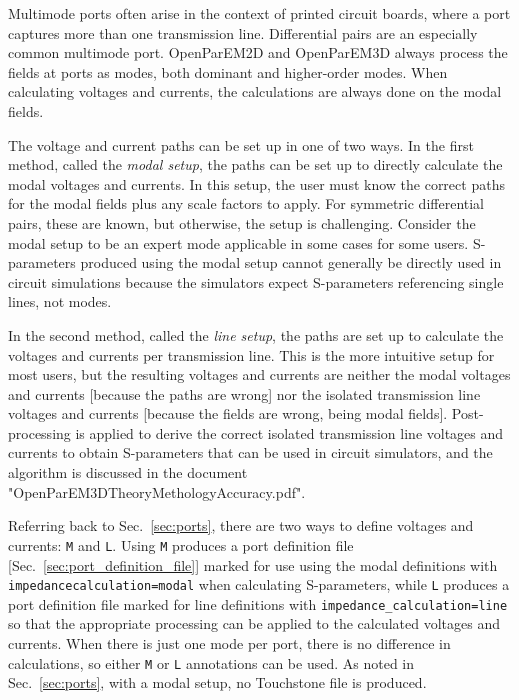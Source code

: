 \documentclass[titlepage]{article}
\renewcommand\_{\textunderscore\linebreak[1]}
\begin{document}
Multimode ports often arise in the context of printed circuit boards, where a port captures more than one transmission line.  Differential pairs are an especially common multimode port.  OpenParEM2D and OpenParEM3D always process the fields at ports as modes, both dominant and higher-order modes. When calculating voltages and currents, the calculations are always done on the modal fields.

The voltage and current paths can be set up in one of two ways.  In the first method, called the \textit{modal setup}, the paths can be set up to directly calculate the modal voltages and currents.  In this setup, the user must know the correct paths for the modal fields plus any scale factors to apply.  For symmetric differential pairs, these are known, but otherwise, the setup is challenging.  Consider the modal setup to be an expert mode applicable in some cases for some users.  S-parameters produced using the modal setup cannot generally be directly used in circuit simulations because the simulators expect S-parameters referencing single lines, not modes.

In the second method, called the \textit{line setup}, the paths are set up to calculate the voltages and currents per transmission line.  This is the more intuitive setup for most users, but the resulting voltages and currents are neither the modal voltages and currents [because the paths are wrong] nor the isolated transmission line voltages and currents [because the fields are wrong, being modal fields].  Post-processing is applied to derive the correct isolated transmission line voltages and currents to obtain S-parameters that can be used in circuit simulators, and the algorithm is discussed in the document "OpenParEM3D\_Theory\_Methology\_Accuracy.pdf".

Referring back to Sec.~\ref{sec:ports}, there are two ways to define voltages and currents: \texttt{\_M} and \texttt{\_L}.  \newline Using \texttt{\_M} produces a port definition file [Sec.~\ref{sec:port_definition_file}] marked for use using the modal definitions with \newline \texttt{impedance\_calculation=modal} when calculating S-parameters, while \texttt{\_L} produces a port definition file marked for line definitions with \verb+impedance_calculation=line+ so that the appropriate processing can be applied to the calculated voltages and currents.
When there is just one mode per port, there is no difference in calculations, so either \texttt{\_M} or \texttt{\_L} annotations can be used.  As noted in Sec.~\ref{sec:ports}, with a modal setup, no Touchstone file is produced.
 
\end{document}
